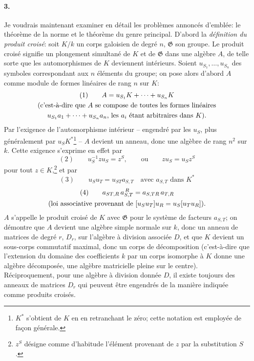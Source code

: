 \paragraph{3.}
Je voudrais maintenant examiner en détail les problèmes annoncés d'emblée: le théorème de la norme et le théorème du genre principal. D'abord la \emph{définition du produit croisé}: soit \(K/k\) un corps galoisien de degré \(n\), \(\mathfrak{G}\) son groupe. Le produit croisé signifie un plongement simultané de \(K\) et de \(\mathfrak{G}\) dans une algèbre \(A\), de telle sorte que les automorphismes de \(K\) deviennent intérieurs. Soient \(u_{S_1},\ldots,u_{S_n}\) des symboles correspondant aux \(n\) éléments du groupe; on pose alors d'abord \(A\) comme module de formes linéaires de rang \(n\) sur \(K\):
\[
\begin{gathered}
(1)\qquad A=u_{S_1}K+\cdots+u_{S_n}K\\
\text{\normalfont(c'est-à-dire que \(A\) se compose de toutes les formes linéaires}\\
\text{\normalfont\(u_{S_1}a_1+\cdots+u_{S_n}a_n\), les \(a_i\) étant arbitraires dans \(K\)).}
\end{gathered}
\]
Par l'exigence de l'automorphisme intérieur -- engendré par les \(u_S\), plus généralement par \(u_SK^\ast\)\footnote{\(K^\ast\) s'obtient de \(K\) en en retranchant le zéro; cette notation est employée de façon générale.} -- \(A\) devient un anneau, donc une algèbre de rang \(n^2\) sur \(k\). Cette exigence s'exprime en effet par
\[
(2)\qquad u_S^{-1}zu_S=z^S,\qquad \text{ou}\qquad zu_S=u_Sz^S
\]
pour tout \(z\in K\),\footnote{\(z^S\) désigne comme d'habitude l'élément provenant de \(z\) par la substitution \(S\).} et par
\[
(3)\qquad u_Su_T=u_{ST}a_{S,T}\quad \text{avec }a_{S,T}\text{ dans }K^\ast
\]
\[
\begin{gathered}
(4)\qquad a_{ST,R}\,a_{S,T}^{\,R}=a_{S,TR}\,a_{T,R}\\
\text{\normalfont(loi associative provenant de \([u_Su_T]u_R=u_S[u_Tu_R]\)).}
\end{gathered}
\]
\(A\) s'appelle le produit croisé de \(K\) avec \(\mathfrak{G}\) pour le système de facteurs \(a_{S,T}\); on démontre que \(A\) devient une algèbre simple normale sur \(k\), donc un anneau de matrices de degré \(r\), \(D_r\), sur l'algèbre à division associée \(D\), et que \(K\) devient un sous-corps commutatif maximal, donc un corps de décomposition (c'est-à-dire que l'extension du domaine des coefficients \(k\) par un corps isomorphe à \(K\) donne une algèbre décomposée, une algèbre matricielle pleine sur le centre). Réciproquement, pour une algèbre à division donnée \(D\), il existe toujours des anneaux de matrices \(D_r\) qui peuvent être engendrés de la manière indiquée comme produits croisés.

